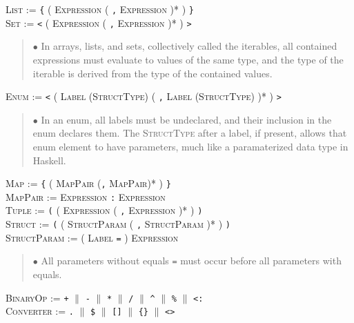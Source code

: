 \documentclass{article}
\newcommand{\code}[1]{\colorbox{light-gray}{\texttt{#1}}}
\begin{document}
\textsc{List} := \code{\{} ( \textsc{Expression} ( \code{,} \textsc{Expression} )* ) \code{\}} \\

\textsc{Set} := \code{<} ( \textsc{Expression} ( \code{,} \textsc{Expression} )* ) \code{>}

\begin{quote} $\bullet$ In arrays, lists, and sets, collectively called the iterables, all contained expressions must evaluate to values of the same type, and the type of the iterable is derived from the type of the contained values. \end{quote}

\textsc{Enum} := \code{<} ( \textsc{Label} (\textsc{StructType}) ( \code{,} \textsc{Label} (\textsc{StructType}) )* ) \code{>} \\

\begin{quote} $\bullet$ In an enum, all labels must be undeclared, and their inclusion in the enum declares them. The \textsc{StructType} after a label, if present, allows that enum element to have parameters, much like a paramaterized data type in Haskell. \end{quote}

\textsc{Map} := \code{\{} ( \textsc{MapPair} (\code{,} \textsc{MapPair})* ) \code{\}} \\

\textsc{MapPair} := \textsc{Expression} \code{:} \textsc{Expression} \\

\textsc{Tuple} := \code{(} ( \textsc{Expression} ( \code{,} \textsc{Expression} )* ) \code{)} \\

\textsc{Struct} := \code{(} ( \textsc{StructParam} ( \code{,} \textsc{StructParam} )* ) \code{)} \\

\textsc{StructParam} := ( \textsc{Label} \code{=} ) \textsc{Expression}

\begin{quote} $\bullet$ All parameters without equals \code{=} must occur before all parameters with equals. \end{quote}

\textsc{BinaryOp} := \code{+} $\|$ \code{-} $\|$ \code{*} $\|$ \code{/} $\|$ \code{\^} $\|$ \code{\%} $\|$ \code{<:} \\

\textsc{Converter} := \code{.} $\|$ \code{\$} $\|$ \code{[]} $\|$ \code{\{\}} $\|$ \code{<>} \\
\end{document}
